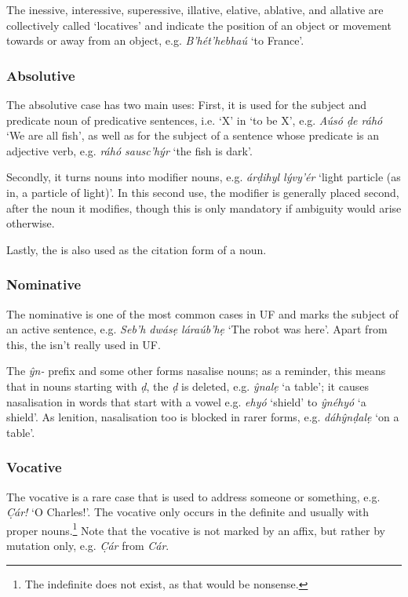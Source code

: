 \documentclass[a4paper, 12pt, twoside, final]{article}
\let \w \textit
\begin{document}
\noindent
The inessive, interessive, superessive, illative, elative, ablative, and allative are collectively called ‘locatives’ and
indicate the position of an object or movement towards or away from an object, e.g. \w{B’hét’hebhaú} ‘to France’.

\subsubsection{Absolutive}
The absolutive case has two main uses: First, it is used for the subject and predicate noun of predicative sentences,
i.e. ‘X’ in ‘to be X’, e.g. \w{Aúsó ḍe ráhó} ‘We are all fish’, as well as for the subject of a sentence whose predicate
is an adjective verb, e.g. \w{ráhó sausc’hýr} ‘the fish is dark’.

Secondly, it turns nouns into modifier nouns, e.g.
\w{árḍihyl lývy’ér} ‘light particle (as in, a particle of light)’. In this second use, the modifier is generally
placed second, after the noun it modifies, though this is only mandatory if ambiguity would arise otherwise.

Lastly, the  is also used as the citation form of a noun.

\subsubsection{Nominative}
The nominative is one of the most common cases in UF and marks the subject of an active sentence, e.g.
\w{Seb’h dwásẹ láraúb’hẹ} ‘The robot was here’. Apart from this, the  isn’t really used in UF.

The  \w{ŷn-} prefix and some other forms nasalise nouns; as a reminder, this means that in
nouns starting with \w{ḍ}, the \w{ḍ} is deleted, e.g. \w{ŷnalẹ} ‘a table’; it causes nasalisation in words
that start with a vowel e.g. \w{ehyó} ‘shield’ to \w{ŷnéhyó} ‘a shield’. As lenition, nasalisation too is
blocked in rarer forms, e.g.  \w{dáhŷnḍalẹ} ‘on a table’.

\subsubsection{Vocative}
The vocative is a rare case that is used to address someone or something, e.g. \w{C̣ár!} ‘O Charles!’. The vocative
only occurs in the definite and usually with proper nouns.\footnote{The indefinite 
does not exist, as that would be nonsense.} Note that the vocative is not marked by an affix, but
rather by mutation only, e.g. \w{C̣ár} from \w{Cár}.
\end{document}
